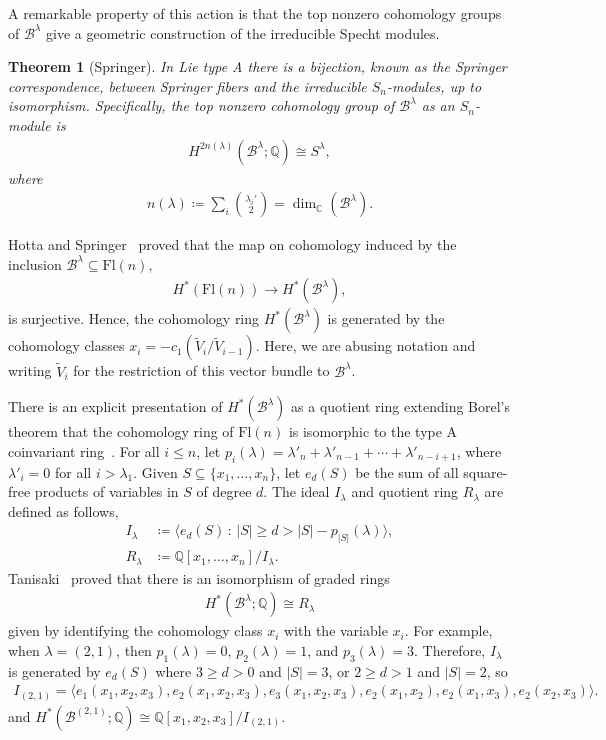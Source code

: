 \documentclass[submission]{FPSAC2021}
\theoremstyle{plain}
\newtheorem{theorem}{Theorem}[section]
\numberwithin{equation}{section}
\newcommand{\bC}{\mathbb{C}}
\newcommand{\bQ}{\mathbb{Q}}
\newcommand{\cB}{\mathcal{B}}
\newcommand{\Fl}{\mathrm{Fl}}
\newcommand{\la}{\lambda}
\begin{document}
A remarkable property of this action is that the top nonzero cohomology groups of $\cB^\lambda$ give a geometric construction of the irreducible Specht modules.
\begin{theorem}[Springer]
In Lie type A there is a bijection, known as the Springer correspondence, between Springer fibers and the irreducible $S_n$-modules, up to isomorphism.  Specifically, the top nonzero cohomology group of $\cB^\lambda$ as an $S_n$-module is
\begin{align}
    H^{2n(\lambda)}(\cB^\lambda;\bQ) \cong S^\lambda,
\end{align}
where 
\begin{align}
    n(\lambda) \coloneqq \sum_i \binom{\lambda_i'}{2} = \dim_\bC(\cB^\lambda).
\end{align}
\end{theorem}

Hotta and Springer~\cite{Hotta-Springer} proved that the map on cohomology induced by the inclusion $\cB^\lambda \subseteq \Fl(n)$,
\begin{align}
    H^*(\Fl(n)) \to H^*(\cB^\lambda),
\end{align}
is surjective. Hence, the cohomology ring $H^*(\cB^\lambda)$ is generated by the cohomology classes $x_i = - c_1(\widetilde V_i/\widetilde V_{i-1})$. Here, we are abusing notation and writing $\widetilde V_i$ for the restriction of this vector bundle to $\cB^\lambda$. 

There is an explicit presentation of $H^*(\cB^\lambda)$ as a quotient ring extending Borel's theorem that the cohomology ring of $\Fl(n)$ is isomorphic to the type A coinvariant ring~\cite{dCP,Tanisaki}. For all $i\leq n$, let $p_i(\lambda) = \la'_n + \la'_{n-1} +\cdots + \la'_{n-i+1}$, where $\la'_i = 0$ for all $i>\la_1$. Given $S\subseteq \{x_1,\dots, x_n\}$, let $e_d(S)$ be the sum of all square-free products of variables in $S$ of degree $d$. The ideal $I_\lambda$ and quotient ring $R_\lambda$ are defined as follows,
\begin{align}
    I_\lambda &\coloneqq \langle e_d(S) \,:\, |S|\geq d > |S| - p_{|S|}(\lambda)\rangle,\\
    R_\lambda &\coloneqq \bQ[x_1,\dots, x_n]/I_\lambda.
\end{align}
Tanisaki~\cite{Tanisaki} proved that there is an isomorphism of graded rings
\begin{align}
    H^*(\cB^\lambda;\bQ) \cong R_\lambda
\end{align}
given by identifying the cohomology class $x_i$ with the variable $x_i$. For example, when $\lambda = (2,1)$, then $p_{1}(\lambda) = 0$, $p_2(\lambda) = 1$, and $p_3(\lambda) = 3$. Therefore, $I_\lambda$ is generated by $e_d(S)$ where $3\geq d>0$ and $|S|=3$, or $2\geq d>1$ and $|S| = 2$, so 
\begin{align}
I_{(2,1)} = \langle e_1(x_1,x_2,x_3), e_2(x_1,x_2,x_3), e_3(x_1,x_2,x_3), e_2(x_1,x_2), e_2(x_1,x_3), e_2(x_2,x_3)\rangle.
\end{align}
and $H^*(\cB^{(2,1)};\bQ)\cong \bQ[x_1,x_2,x_3]/I_{(2,1)}$.
\end{document}
